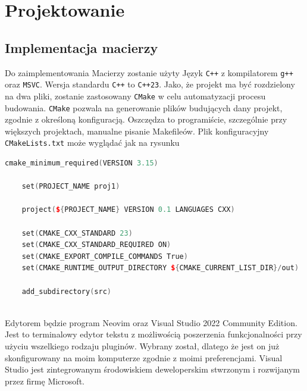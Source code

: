 	\newpage
\section{Projektowanie}		%

\subsection{Implementacja macierzy}


Do zaimplementowania Macierzy zostanie użyty Język \texttt{C++} z kompilatorem \texttt{g++} oraz \texttt{MSVC}. Wersja standardu \texttt{C++} to \texttt{C++23}. Jako, że projekt ma być rozdzielony na dwa pliki, zostanie zastosowany \texttt{CMake} w celu automatyzacji procesu budowania. \texttt{CMake} pozwala na generowanie plików budujących dany projekt, zgodnie z określoną konfiguracją. Oszczędza to programiście, szczególnie przy większych projektach, manualne pisanie Makefileów.
Plik konfiguracyjny \texttt{CMakeLists.txt} może wyglądać jak na rysunku

\begin{lstlisting}[caption=Plik konfiguracyjny CMake, label={lst:cmakelists}, language=C++]
	cmake_minimum_required(VERSION 3.15)
	
	set(PROJECT_NAME proj1)
	
	project(${PROJECT_NAME} VERSION 0.1 LANGUAGES CXX)
	
	set(CMAKE_CXX_STANDARD 23)
	set(CMAKE_CXX_STANDARD_REQUIRED ON)
	set(CMAKE_EXPORT_COMPILE_COMMANDS True)
	set(CMAKE_RUNTIME_OUTPUT_DIRECTORY ${CMAKE_CURRENT_LIST_DIR}/out)
	
	add_subdirectory(src)
	
\end{lstlisting}

Edytorem będzie program Neovim oraz Visual Studio 2022 Community Edition. Jest to terminalowy edytor tekstu z możliwością poszerzenia funkcjonalności przy użyciu wszelkiego rodzaju pluginów. Wybrany został, dlatego że jest on już skonfigurowany na moim komputerze zgodnie z moimi preferencjami. Visual Studio jest zintegrowanym środowiskiem deweloperskim stwrzonym i rozwijanym przez firmę Microsoft.

